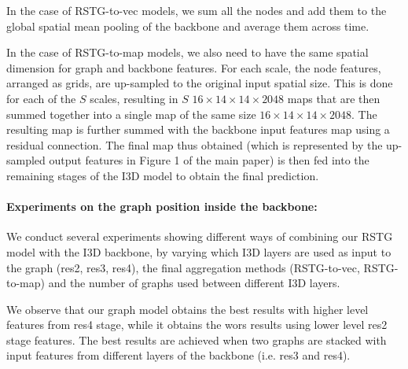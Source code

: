 \documentclass{article}
\begin{document}
In the case of RSTG-to-vec models, we sum all the nodes and add them to the global spatial mean pooling of the backbone and average them across time.

In the case of RSTG-to-map models, we also need to have the same spatial dimension for graph and backbone features. 
For each scale, the node features, arranged as grids, are up-sampled to the original input spatial size. This is done for each of the $S$ scales, resulting in $S$ $16 \times 14 \times 14 \times 2048$ maps that are then summed together into a single map of the same size $16 \times 14 \times 14 \times 2048$. The resulting map is further summed with the backbone input features map using a residual connection. The final map thus obtained (which is represented by the up-sampled output features in Figure 1 of the main paper) is then fed into the remaining stages of the I3D model to obtain the final prediction.


\paragraph{Experiments on the graph position inside the backbone: } We conduct several experiments showing different ways of combining our RSTG model with the I3D backbone, by varying which I3D layers are used as input to the graph (res2, res3, res4), the final aggregation methods (RSTG-to-vec, RSTG-to-map) and the number of graphs used between different I3D layers.

We observe that our graph model obtains the best results with higher level features from res4 stage, while it obtains the wors results using lower level res2 stage features. The best results are achieved when two graphs are stacked with input features from different layers of the backbone (i.e. res3 and res4).
\end{document}
